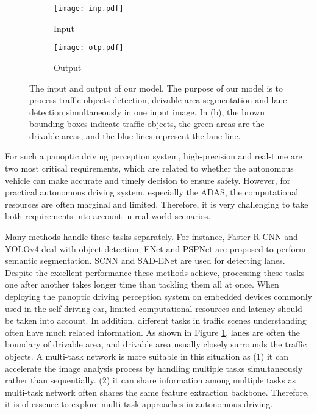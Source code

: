 \documentclass[10pt,twocolumn,letterpaper]{article}
\begin{document}
\begin{figure}\centering
\begin{subfigure}{\linewidth}
\texttt{[image: inp.pdf]}
  \caption{Input}
\end{subfigure}

\bigskip
\begin{subfigure}{\linewidth}
\texttt{[image: otp.pdf]}
  \caption{Output}
\end{subfigure}
\caption{ The input and output of our model. The purpose of our model is to process traffic objects detection, drivable area segmentation and lane detection simultaneously in one input image. In (b), the brown bounding boxes indicate traffic objects, the green areas are the drivable areas, and the blue lines represent the lane line.}
\label{fig:total}
\end{figure}

For such a panoptic driving perception system, high-precision and real-time are two most critical requirements, which are related to whether the autonomous vehicle can make accurate and timely decision to ensure safety. However, for practical autonomous driving system, especially the ADAS, the computational resources are often marginal and limited. Therefore, it is very challenging to take both requirements into account in real-world scenarios.


Many methods handle these tasks separately. For instance, Faster R-CNN \cite{faster-rcnn} and YOLOv4 \cite{yolov4} deal with object detection; ENet \cite{enet} and PSPNet \cite{pspnet} are proposed to perform semantic segmentation. SCNN \cite{scnn} and SAD-ENet \cite{sad-enet} are used for detecting lanes. Despite the excellent performance these methods achieve, processing these tasks one after another takes longer time than tackling them all at once. When deploying the panoptic driving perception system on embedded devices commonly used in the self-driving car, limited computational resources and latency should be taken into account. In addition, different tasks in traffic scenes understanding often have much related information. As shown in Figure \ref{fig:total}, lanes are often the boundary of drivable area, and drivable area usually closely surrounds the traffic objects. A multi-task network is more suitable in this situation as (1) it can accelerate the image analysis process by handling multiple tasks simultaneously 
rather than sequentially. (2) it can share information among multiple tasks as multi-task network often shares the same feature extraction backbone. Therefore, it is of essence to explore multi-task approaches in autonomous driving.
\end{document}
